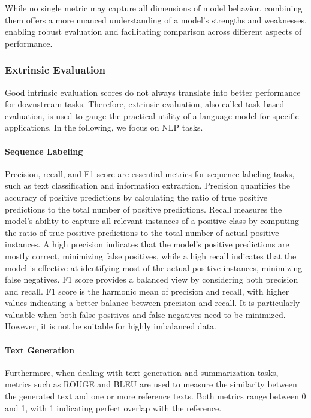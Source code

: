 While no single metric may capture all dimensions of model behavior, combining them offers a more nuanced understanding of a model's strengths and weaknesses, enabling robust evaluation and facilitating comparison across different aspects of performance.

\subsubsection{Extrinsic Evaluation} Good intrinsic evaluation scores do not always translate into better performance for downstream tasks. Therefore, extrinsic evaluation, also called task-based evaluation, is used to gauge the practical utility of a language model for specific applications. In the following, we focus on \ac{NLP} tasks.

\paragraph{Sequence Labeling} Precision, recall, and F1 score are essential metrics for sequence labeling tasks, such as text classification and information extraction. Precision quantifies the accuracy of positive predictions by calculating the ratio of true positive predictions to the total number of positive predictions. Recall measures the model's ability to capture all relevant instances of a positive class by computing the ratio of true positive predictions to the total number of actual positive instances. A high precision indicates that the model's positive predictions are mostly correct, minimizing false positives, while a high recall indicates that the model is effective at identifying most of the actual positive instances, minimizing false negatives. F1 score provides a balanced view by considering both precision and recall. F1 score is the harmonic mean of precision and recall, with higher values indicating a better balance between precision and recall. It is particularly valuable when both false positives and false negatives need to be minimized. However, it is not be suitable for highly imbalanced data.

\paragraph{Text Generation} Furthermore, when dealing with text generation and summarization tasks, metrics such as \ac{ROUGE} \citep{lin2004rouge} and \ac{BLEU} \citep{papineni2002bleu} are used to measure the similarity between the generated text and one or more reference texts. Both metrics range between 0 and 1, with 1 indicating perfect overlap with the reference.

